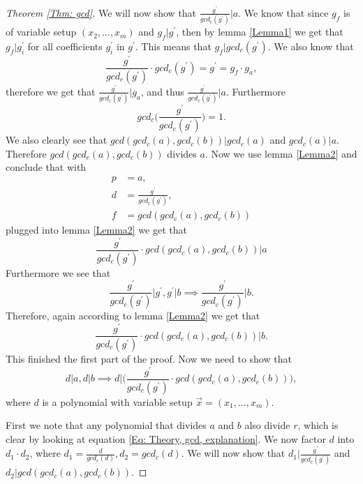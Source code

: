 \begin{proof}[Theorem \ref{Thm: gcd}]
  We will now show that $\frac{g^\prime}{gcd_c(g^\prime)}|a$. We know that since $g_f$ is of variable setup $(x_2,\ldots,x_m)$ and $g_f|g^\prime$, then by lemma \ref{Lemma1} we get that $g_f|g_i^\prime$ for all coefficients $g_i^\prime$ in $g^\prime$. This means that $g_f|gcd_c(g^\prime)$. We also know that
  \begin{equation}
    \frac{g^\prime}{gcd_c(g^\prime)}\cdot gcd_c(g^\prime) = g^\prime = g_f\cdot g_a,
  \end{equation}
  therefore we get that $\frac{g^\prime}{gcd_c(g^\prime)}|g_a$, and thus $\frac{g^\prime}{gcd_c(g^\prime)}|a$. Furthermore
  \begin{equation}
    gcd_c\Big(\frac{g^\prime}{gcd_c(g^\prime)}\Big)=1.
  \end{equation}
  We also clearly see that $gcd(gcd_c(a),gcd_c(b))|gcd_c(a)$ and $gcd_c(a)|a$. Therefore $gcd(gcd_c(a),gcd_c(b))$ divides $a$. Now we use lemma \ref{Lemma2} and conclude that with
  \begin{equation}
    \begin{split}
      p&=a, \\
      d&=\frac{g^\prime}{gcd_c(g^\prime)}, \\
      f&=gcd(gcd_c(a),gcd_c(b))
    \end{split}
  \end{equation}
  plugged into lemma \ref{Lemma2} we get that
  \begin{equation}
    \frac{g^\prime}{gcd_c(g^\prime)}\cdot gcd(gcd_c(a),gcd_c(b)) | a
  \end{equation}
  Furthermore we see that
  \begin{equation}
    \frac{g^\prime}{gcd_c(g^\prime)}\Big|g^\prime,g^\prime|b \implies \frac{g^\prime}{gcd_c(g^\prime)}\Big|b.
  \end{equation}
  Therefore, again according to lemma \ref{Lemma2} we get that
  \begin{equation}
    \frac{g^\prime}{gcd_c(g^\prime)}\cdot gcd(gcd_c(a),gcd_c(b)) | b.
  \end{equation}
  This finished the first part of the proof. Now we need to show that
  \begin{equation}
    d|a,d|b\implies d\Big|\Big(\frac{g^\prime}{gcd_c(g^\prime)}\cdot gcd(gcd_c(a),gcd_c(b))\Big),
  \end{equation}
  where $d$ is a polynomial with variable setup $\vec{x}=(x_1,\ldots,x_m)$.

  First we note that any polynomial that divides $a$ and $b$ also divide $r$, which is clear by looking at equation \ref{Eq: Theory, gcd, explanation}. We now factor $d$ into $d_1\cdot d_2$, where $d_1=\frac{d}{gcd_c(d)}, d_2=gcd_c(d)$. We will now show that $d_1|\frac{g^\prime}{gcd_c(g^\prime)}$ and $d_2|gcd(gcd_c(a),gcd_c(b))$.


\end{proof}
